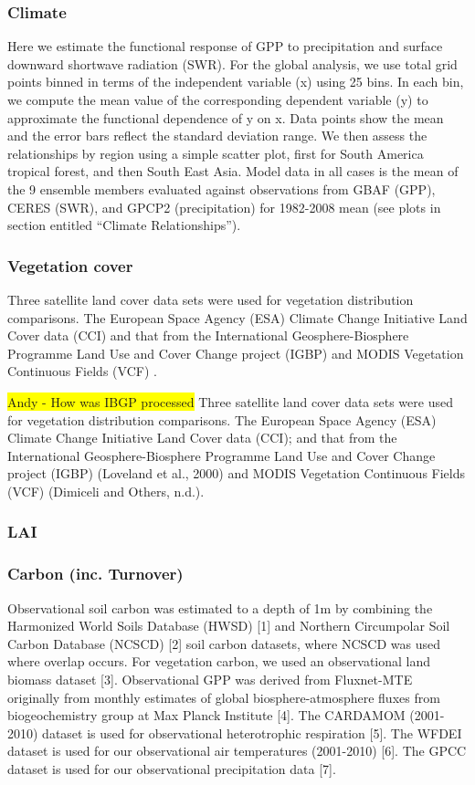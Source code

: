 \documentclass[bg, manuscript]{copernicus}
\newcommand{\hilight}[1]{\colorbox{yellow}{#1}}
\begin{document}
\subsubsection{Climate}
Here we estimate the functional response of GPP to precipitation and surface downward shortwave radiation (SWR). For the global analysis, we use total grid points binned in terms of the independent variable (x) using 25 bins. In each bin, we compute the mean value of the corresponding dependent variable (y) to approximate the functional dependence of y on x. Data points show the mean and the error bars reﬂect the standard deviation range. We then assess the relationships by region using a simple scatter plot, first for South America tropical forest, and then South East Asia. Model data in all cases is the mean of the 9 ensemble members evaluated against observations from GBAF (GPP), CERES (SWR), and GPCP2 (precipitation) for 1982-2008 mean (see plots in section entitled “Climate Relationships”).

\subsubsection{Vegetation cover}
Three satellite land cover data sets were used for vegetation distribution comparisons. The European Space Agency (ESA) Climate Change Initiative Land Cover data (CCI)\cite{hartley2017uncertainty} and that from the International Geosphere-Biosphere Programme Land Use and Cover Change project (IGBP) \citep{Loveland2000-sx} and MODIS Vegetation Continuous Fields (VCF) \citep{Dimiceli_undated-el}.

\hilight{Andy - How was IBGP processed}
Three satellite land cover data sets were used for vegetation distribution comparisons. The European Space Agency (ESA) Climate Change Initiative Land Cover data (CCI); \cite{hartley2017uncertainty,Poulter2015-lo} and that from the International Geosphere-Biosphere Programme Land Use and Cover Change project (IGBP) (Loveland et al., 2000) and MODIS Vegetation Continuous Fields (VCF) (Dimiceli and Others, n.d.).

\subsubsection{LAI}


\subsubsection{Carbon (inc. Turnover)}
Observational soil carbon was estimated to a depth of 1m by combining the Harmonized World Soils Database (HWSD) [1] and Northern Circumpolar Soil Carbon Database (NCSCD) [2] soil carbon datasets, where NCSCD was used where overlap occurs. For vegetation carbon, we used an observational land biomass dataset [3]. Observational GPP was derived from Fluxnet-MTE originally from monthly estimates of global biosphere-atmosphere fluxes from biogeochemistry group at Max Planck Institute [4]. The CARDAMOM (2001-2010) dataset is used for observational heterotrophic respiration [5]. The WFDEI dataset is used for our observational air temperatures (2001-2010) [6]. The GPCC dataset is used for our observational precipitation data [7].
\end{document}
